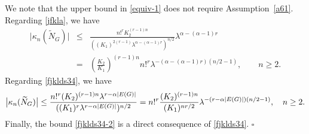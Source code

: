 \documentclass[12pt]{article}
\newenvironment{Proof}{\removelastskip\par\medskip
\noindent{\em Proof.} \rm}{\penalty-20\null\hfill$\square$\par\medbreak}
\numberwithin{equation}{section}
\begin{document}
\begin{Proof}
  We note that the upper bound in \eqref{equiv-1}
  does not require Assumption~\ref{a61}. 
  Regarding \eqref{jfkla}, we have  
\begin{eqnarray*} 
  \big|\kappa_n(\widetilde{N}_G)\big|
& \leq &  
  \frac{n!^r %
    K_2^{(r-1)n}}{
   (
    (K_1)^{2(r-1)}
        \lambda^{
\alpha      -(\alpha - 1)r 
        }
        )^{n/2}}
  \lambda^{
 \alpha          -(\alpha - 1)r 
  }
    \\
    & = & 
 \left(
   \frac{K_2}{K_1}
   \right)^{(r-1)n}
   n!^r
        \lambda^{-(
 \alpha      -(\alpha - 1)r 
       ) ( n/2-1)
   }, \qquad n \geq 2.
\end{eqnarray*} 
   \noindent
 Regarding \eqref{fjklds34}, we have  
$$ 
   \big|\kappa_n(\widetilde{N}_G)\big|
 \leq 
   \frac{
  n!^r
  (K_2)^{(r-1)n}
  \lambda^{r-\alpha |E(G)|}
   }{
            (
     (K_1)^r
     \lambda^{r-\alpha |E(G)|}
     )^{n/2}}
=
   n!^r
   \frac{
     (K_2)^{(r-1)n}}{(K_1)^{nr/2}}
      \lambda^{ - (r-\alpha |E(G)|)(n/2 - 1)}  , 
  \quad n \geq 2. 
$$ 
 Finally, the bound 
 \eqref{fjklds34-2} is a direct consequence of \eqref{fjklds34}. 
\end{Proof}
\end{document}
